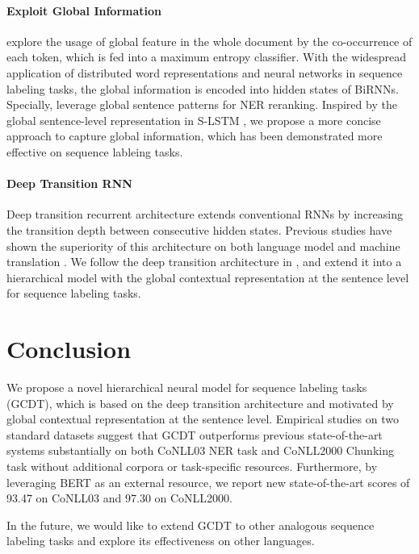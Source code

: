 \documentclass[11pt,a4paper]{article}
\begin{document}
\paragraph{Exploit Global Information}
\citeauthor{global_information}  explore the usage of global feature in the whole document by the co-occurrence of each token, which is fed into a maximum entropy classifier.
With the widespread application of distributed word representations \cite{word2vec} and neural networks \cite{collobert2011,BLSTM+CRF} in sequence labeling tasks, the global information is encoded into hidden states of BiRNNs. Specially, \citeauthor{reranking}  leverage global sentence patterns for NER reranking. Inspired by the global sentence-level representation in S-LSTM \cite{SLSTM}, we propose a more concise approach to capture global information,  which has been demonstrated more effective on sequence lableing tasks.

\paragraph{Deep Transition RNN}
Deep transition recurrent architecture extends conventional RNNs by increasing the transition depth between consecutive hidden states. Previous studies have shown the superiority of this architecture on both language model \cite{DT_language_model} and machine translation \cite{DT_machine_translation,DTMT}. We follow the deep transition architecture in \cite{DTMT}, and extend it into a hierarchical model with the global contextual representation at the sentence level for sequence labeling tasks.

\section{Conclusion}
We propose a novel hierarchical neural model for sequence labeling tasks (GCDT), which is based on the deep transition architecture and motivated by global contextual representation at the sentence level. Empirical studies on two standard datasets suggest that GCDT outperforms previous state-of-the-art systems substantially on both CoNLL03 NER task and CoNLL2000 Chunking task without additional corpora or task-specific resources. Furthermore, by leveraging BERT as an external resource, we report new state-of-the-art  scores of 93.47 on CoNLL03 and 97.30 on CoNLL2000.

In the future, we would like to extend GCDT to other analogous sequence labeling tasks and explore its effectiveness on other languages.
\end{document}
